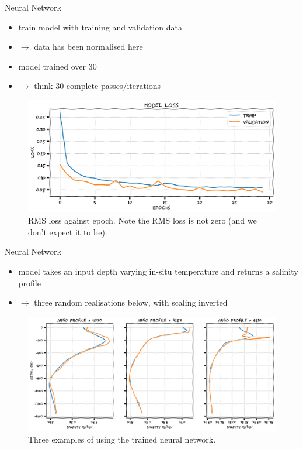 \documentclass[xcolor=x11names,compress]{beamer}
\renewcommand{\(}{\begin{columns}}
\renewcommand{\)}{\end{columns}}
\newcommand{\<}[1]{\begin{column}{#1}}
\renewcommand{\>}{\end{column}}
\begin{document}
\begin{frame}{Neural Network}

\begin{itemize}
  \item train model with training and validation data
  \item[] $\to$ data has been normalised here
  \item model trained over 30 
  \item[] $\to$ think 30 complete passes/iterations
\end{itemize}

\begin{figure}
  \includegraphics[width=\textwidth]{argo_data_neural_network}
  \caption{RMS loss against epoch. Note the RMS loss is not zero (and we don't
  expect it to be).}
\end{figure}

\end{frame}


\begin{frame}{Neural Network}

\begin{itemize}
  \item model takes an input depth varying {\tiny in-situ} temperature and
  returns a salinity profile
  \item[] $\to$ three random realisations below, with scaling inverted
\end{itemize}

\begin{figure}
  \includegraphics[width=\textwidth]{argo_data_neural_network_predict}
  \caption{Three examples of using the trained neural network.}
\end{figure}

\end{frame}
\end{document}
